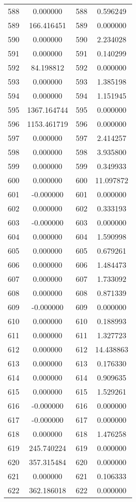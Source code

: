 \documentclass[12pt]{article}
\begin{document}
\begin{longtable}{@{}cccc@{}}
588 & 0.000000 & 588 & 0.596249 \\
589 & 166.416451 & 589 & 0.000000 \\
590 & 0.000000 & 590 & 2.234028 \\
591 & 0.000000 & 591 & 0.140299 \\
592 & 84.198812 & 592 & 0.000000 \\
593 & 0.000000 & 593 & 1.385198 \\
594 & 0.000000 & 594 & 1.151945 \\
595 & 1367.164744 & 595 & 0.000000 \\
596 & 1153.461719 & 596 & 0.000000 \\
597 & 0.000000 & 597 & 2.414257 \\
598 & 0.000000 & 598 & 3.935800 \\
599 & 0.000000 & 599 & 0.349933 \\
600 & 0.000000 & 600 & 11.097872 \\
601 & -0.000000 & 601 & 0.000000 \\
602 & 0.000000 & 602 & 0.333193 \\
603 & -0.000000 & 603 & 0.000000 \\
604 & 0.000000 & 604 & 1.590998 \\
605 & 0.000000 & 605 & 0.679261 \\
606 & 0.000000 & 606 & 1.484473 \\
607 & 0.000000 & 607 & 1.733092 \\
608 & 0.000000 & 608 & 0.871339 \\
609 & -0.000000 & 609 & 0.000000 \\
610 & 0.000000 & 610 & 0.188993 \\
611 & 0.000000 & 611 & 1.327723 \\
612 & 0.000000 & 612 & 14.438863 \\
613 & 0.000000 & 613 & 0.176330 \\
614 & 0.000000 & 614 & 0.909635 \\
615 & 0.000000 & 615 & 1.529261 \\
616 & -0.000000 & 616 & 0.000000 \\
617 & -0.000000 & 617 & 0.000000 \\
618 & 0.000000 & 618 & 1.476258 \\
619 & 245.740224 & 619 & 0.000000 \\
620 & 357.315484 & 620 & 0.000000 \\
621 & 0.000000 & 621 & 0.106333 \\
622 & 362.186018 & 622 & 0.000000 \\

\end{longtable}
\end{document}
